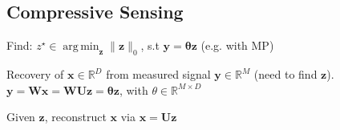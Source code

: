 \documentclass[a4paper, 11pt, landscape]{article}
\DeclareMathOperator*{\argmin}{arg\,min}
\begin{document}
\begin{multicols*}{3}
\subsection{Compressive Sensing}
\begin{compactitem}
  \item Find: $z^\star \in \argmin_{\mathbf{z}}\|\mathbf{z}\|_0$, s.t $\mathbf{y} = \mathbf{\theta z}$ (e.g. with MP)
  \item Recovery of $\mathbf{x} \in \mathbb{R}^D$ from measured signal $\mathbf{y} \in \mathbb{R}^M$ (need to find $\mathbf{z}$).
  $\mathbf{y} = \mathbf{Wx} = \mathbf{WUz} = \mathbf{\theta z}$, with $\theta \in \mathbb{R}^{M \times D}$
  \item Given $\mathbf{z}$, reconstruct $\mathbf{x}$ via $\mathbf{x} = \mathbf{Uz}$
\end{compactitem}


\end{multicols*}
\end{document}
